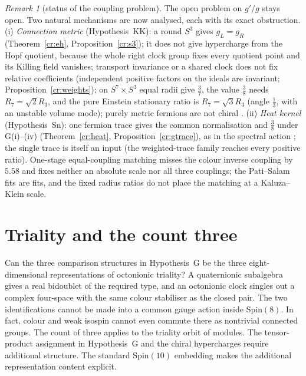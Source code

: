 \documentclass[aps,pra,onecolumn,superscriptaddress,nofootinbib,10pt]{revtex4-2}
\theoremstyle{definition}
\theoremstyle{remark}
\newtheorem{remark}[theorem]{Remark}
\begin{document}
\begin{remark}[status of the coupling problem]\label{rem:crstatus}
The open problem on $g'/g$ stays open.  Two natural mechanisms are now analysed, each with its exact obstruction.
(i) \emph{Connection metric} (Hypothesis~KK): a round $S^3$ gives $g_L=g_R$ (Theorem~\ref{cr:eh}, Proposition~\ref{cr:s3});
it does not give hypercharge from the Hopf quotient, because the whole right clock group fixes every quotient
point and its Killing field vanishes; transport invariance or a shared clock does not fix relative
coefficients (independent positive factors on the ideals are invariant; Proposition~\ref{cr:weights}); on $S^7\times S^3$
equal radii give $\tfrac37$, the value $\tfrac38$ needs $R_7=\sqrt2R_3$, and the pure Einstein stationary ratio is $R_7=\sqrt3R_3$
(angle $\tfrac13$, with an unstable volume mode); purely metric fermions are not chiral \cite{cr:wittenkk}.
(ii) \emph{Heat kernel} (Hypothesis~Sn): one fermion trace gives the common normalisation and $\tfrac38$ under
G(i)--(iv) (Theorem~\ref{cr:heat}, Proposition~\ref{cr:gtrace}), as in the spectral action \cite{n7:CC,cr:ccm}; the
single trace is itself an input (the weighted-trace family reaches every positive ratio).  One-stage
equal-coupling matching misses the colour inverse coupling by $5.58$ and fixes neither an absolute scale nor
all three couplings; the Pati--Salam fits are fits, and the fixed radius ratios do not place the matching at
a Kaluza--Klein scale.
\end{remark}

\section{Triality and the count three}\label{sec:triality}

Can the three comparison structures in Hypothesis~G be the three
eight-dimensional representations of octonionic triality? A quaternionic
subalgebra gives a real bidoublet of the required type, and an octonionic
clock singles out a complex four-space with the same colour stabiliser as
the closed pair. The two identifications cannot be made into a common gauge
action inside \(\mathrm{Spin}(8)\). In fact, colour and weak isospin
cannot even commute there as nontrivial connected groups. The count of
three applies to the triality orbit of modules. The tensor-product
assignment in Hypothesis~G and the chiral hypercharges require additional
structure. The standard \(\mathrm{Spin}(10)\) embedding makes the
additional representation content explicit.
\end{document}
